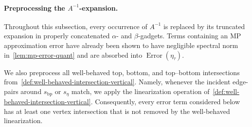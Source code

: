 \documentclass[12pt]{article}
\newtheorem{claim}[theorem]{Claim}
\newcommand{\calL}{\mathcal{L}}
\begin{document}

%
%	

\paragraph{Preprocessing the \(A^{-1}\)-expansion.}
Throughout this subsection, every occurrence of \(A^{-1}\) is replaced by its
truncated expansion in properly concatenated \(\alpha\)- and \(\beta\)-gadgets.
Terms containing an MP approximation error have already been shown to have
negligible spectral norm in~\cref{lem:mp-error-quant} and are absorbed into
\(\operatorname{Error}(\eta_\tau)\).

We also preprocess all well-behaved top, bottom, and top--bottom intersections
from~\cref{def:well-behaved-intersection-vertical}. Namely, whenever the
incident edge-pairs around \(s_{\mathrm{bp}}\) or \(s_\eta\) match, we apply
the linearization operation of~\cref{def:well-behaved-intersection-vertical}.
Consequently, every error term considered below has at least one vertex
intersection that is not removed by the well-behaved linearization.
\end{document}
